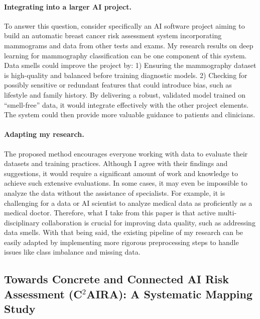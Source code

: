 \documentclass[11pt]{article}
\begin{document}
\paragraph{Integrating into a larger AI project.}
To answer this question, consider specifically an AI software project aiming to build an automatic breast cancer risk assessment system incorporating mammograms and data from other tests and exams. 
My research results on deep learning for mammography classification can be one component of this system. 
Data smells could improve the project by: 1) Ensuring the mammography dataset is high-quality and balanced before training diagnostic models.
2) Checking for possibly sensitive or redundant features that could introduce bias, such as lifestyle and family history.
By delivering a robust, validated model trained on ``smell-free'' data, it would integrate effectively with the other project elements.
The system could then provide more valuable guidance to patients and clinicians.

\paragraph{Adapting my research.}
The proposed method encourages everyone working with data to evaluate their datasets and training practices. 
Although I agree with their findings and suggestions, it would require a significant amount of work and knowledge to achieve such extensive evaluations. 
In some cases, it may even be impossible to analyze the data without the assistance of specialists. 
For example, it is challenging for a data or AI scientist to analyze medical data as proficiently as a medical doctor.
Therefore, what I take from this paper is that active multi-disciplinary collaboration is crucial for improving data quality, such as addressing data smells. 
With that being said, the existing pipeline of my research can be easily adapted by implementing more rigorous preprocessing steps to handle issues like class imbalance and missing data.

\subsection{Towards Concrete and Connected AI Risk Assessment (C$^2$AIRA): A Systematic Mapping Study \cite{xia2023towards}}
\end{document}
